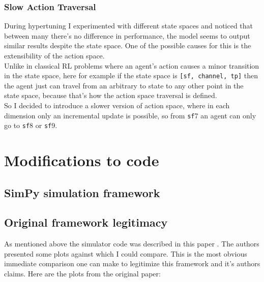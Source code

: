 \subsection{Slow Action Traversal}
During hypertuning I experimented with different state spaces
and noticed that between many there's no difference in 
performance, the model seems to output similar results
despite the state space. One of the possible causes for this
is the extensibility of the action space. \\

Unlike in classical RL problems where an agent's action causes
a minor transition in the state space, here for example if 
the state space is \texttt{[sf, channel, tp]} then the agent
just can travel from an arbitrary to state to any other point
in the state space, because that's how the action space 
traversal is defined. \\

So I decided to introduce a slower version of action space,
where in each dimension only an incremental update is possible,
so from \texttt{sf}7 an agent can only go to \texttt{sf}8 or \texttt{sf}9.



\chapter{Modifications to code}

\section{SimPy simulation framework}

\section{Original framework legitimacy}
As mentioned above the simulator code was described in this 
paper \cite{simulator}. The authors presented some plots against
which I could compare. This is the most obvious immediate 
comparison one can make to legitimize this framework and it's
authors claims. Here are the plots from the original paper:

